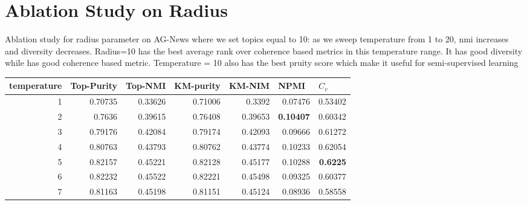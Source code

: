 \documentclass[11pt]{article}
\begin{document}
\section{Ablation Study on Radius}
\label{radius}
Ablation study for radius parameter on AG-News where we set topics equal to 10: as we sweep temperature from 1 to 20, nmi increases and diversity decreases. Radius=10 has the best average rank over coherence based metrics in this temperature range. It has good diversity while has good coherence based metric. Temperature = 10 also has the best pruity score which make it useful for semi-supervised learning 
\begin{table}
\centering

\begin{tabular}{|r|r|r|r|r|r|r|}
\multicolumn{1}{l}{temperature} & \multicolumn{1}{l}{Top-Purity} & \multicolumn{1}{l}{Top-NMI} & \multicolumn{1}{l}{KM-purity} & \multicolumn{1}{l}{KM-NIM} & \multicolumn{1}{l}{NPMI} & \multicolumn{1}{l}{$C_v$}  \\ 
\hline
1                               & 0.70735                    & 0.33626                 & 0.71006                       & 0.3392                     & 0.07476                  & 0.53402                 \\ 
\hline
2                               & 0.7636                     & 0.39615                 & 0.76408                       & 0.39653                    & \textbf{0.10407}                  & 0.60342                 \\ 
\hline
3                               & 0.79176                    & 0.42084                 & 0.79174                       & 0.42093                    & 0.09666                  & 0.61272                 \\ 
\hline
4                               & 0.80763                    & 0.43793                 & 0.80762                       & 0.43774                    & 0.10233                  & 0.62054                 \\ 
\hline
5                               & 0.82157                    & 0.45221                 & 0.82128                       & 0.45177                    & 0.10288                  & \textbf{0.6225}                  \\ 
\hline
6                               & 0.82232                    & 0.45522                 & 0.82221                       & 0.45498                    & 0.09325                  & 0.60377                 \\ 
\hline
7                               & 0.81163                    & 0.45198                 & 0.81151                       & 0.45124                    & 0.08936                  & 0.58558                 \\ 

\end{tabular}
\end{table}
\end{document}
